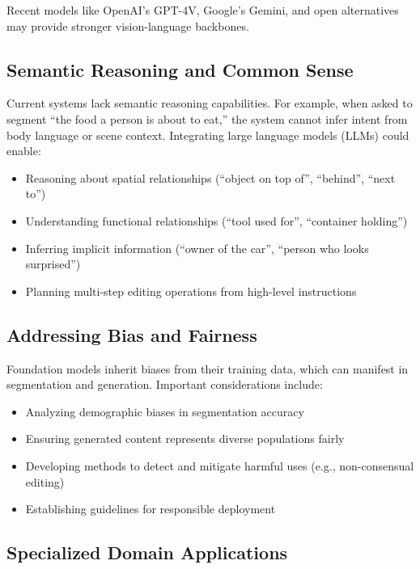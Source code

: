 Recent models like OpenAI's GPT-4V, Google's Gemini, and open alternatives may provide stronger vision-language backbones.

\subsection{Semantic Reasoning and Common Sense}

Current systems lack semantic reasoning capabilities. For example, when asked to segment ``the food a person is about to eat,'' the system cannot infer intent from body language or scene context. Integrating large language models (LLMs) could enable:
\begin{itemize}
    \item Reasoning about spatial relationships (``object on top of'', ``behind'', ``next to'')
    \item Understanding functional relationships (``tool used for'', ``container holding'')
    \item Inferring implicit information (``owner of the car'', ``person who looks surprised'')
    \item Planning multi-step editing operations from high-level instructions
\end{itemize}

\subsection{Addressing Bias and Fairness}

Foundation models inherit biases from their training data, which can manifest in segmentation and generation. Important considerations include:
\begin{itemize}
    \item Analyzing demographic biases in segmentation accuracy
    \item Ensuring generated content represents diverse populations fairly
    \item Developing methods to detect and mitigate harmful uses (e.g., non-consensual editing)
    \item Establishing guidelines for responsible deployment
\end{itemize}

\subsection{Specialized Domain Applications}

